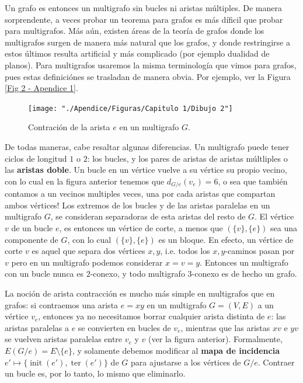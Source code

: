 \documentclass[../main.tex]{subfiles}
\begin{document}
Un grafo es entonces un multigrafo sin bucles ni aristas múltiples. De manera sorprendente, a veces probar un teorema
 para grafos es más díficil que probar para multigrafos. Más aún, existen áreas de la teoría de grafos donde los
 multigrafos surgen de manera más natural que los grafos, y donde restringirse a estos últimos resulta artificial y
 más complicado (por ejemplo dualidad de planos). Para multigrafos usaremos la misma terminología que vimos para
 grafos, pues estas definiciónes se trasladan de manera obvia. Por ejemplo, ver la Figura \ref{Fig 2 - Apendice 1}.

 \begin{center}
 \begin{figure}
    \texttt{[image: "./Apendice/Figuras/Capitulo
    1/Dibujo 2"]}
    \caption{Contración de la arista $e$ en un multigrafo $G$.}
\end{figure}
\label{Fig 2 - Apendice 1}
\end{center}

De todas maneras, cabe resaltar algunas diferencias. Un multigrafo puede tener ciclos de longitud $1$ o $2$: los
bucles, y los pares de aristas de aristas múltliples o las \textbf{aristas doble}. Un bucle en un vértice vuelve a su
 vértice su propio vecino, con lo cual en la figura anterior tenemos que $d_{G/e} (v_e) = 6$, o sea que también
 contamos a un vecinos multiples veces, una por cada aristas que compartan ambos vértices! Los extremos de los bucles
  y de las aristas paralelas en un multigrafo $G$, se consideran separadoras de esta aristas del resto de $G$. El
  vértice $v$ de un bucle $e$, es entonces un vértice de corte, a menos que $(\{v\}, \{e\})$ sea una componente de $G$, con lo cual $(\{v\}, \{e\})$ es un bloque. En efecto, un vértice de corte $v$ es aquel que separa dos vértices $x,y$, i.e. todos los $x,y$-caminos pasan por $v$ pero en un multigrafo podemos considerar $x=v=y$. Entonces un multigrafo con un bucle nunca es $2$-conexo, y todo multigrafo $3$-conexo es de hecho un grafo.

La noción de arista contracción es mucho más simple en multigrafos que en grafos: si contraemos una arista $e = xy$
en un multigrafo $G=(V,E)$ a un vértice $v_e$, entonces ya no necesitamos borrar cualquier arista distinta de $e$:
las aristas paralelas a $e$ se convierten en bucles de $v_e$, mientras que las aristas $xv$ e $yv$ se vuelven aristas
 paralelas entre $v_e$ y $v$ (ver la figura anterior). Formalmente, $E(G/e) = E \setminus \{e\}$, y solamente debemos
  modificar al \textbf{mapa de incidencia} $e' \mapsto \{ \operatorname{init}(e'), \operatorname{ter}(e')\}$ de $G$
  para ajustarse a los vértices de $G/e$. Contraer un bucle es, por lo tanto, lo mismo que eliminarlo.
\end{document}
